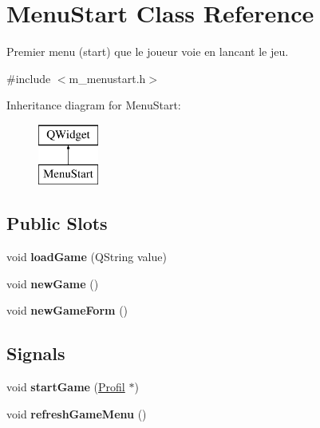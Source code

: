 \hypertarget{class_menu_start}{}\section{Menu\+Start Class Reference}
\label{class_menu_start}


Premier menu (start) que le joueur voie en lancant le jeu.  




{\ttfamily \#include $<$m\+\_\+menustart.\+h$>$}

Inheritance diagram for Menu\+Start\+:\begin{figure}[H]
\begin{center}
\leavevmode
\includegraphics[height=2.000000cm]{class_menu_start}
\end{center}
\end{figure}
\subsection*{Public Slots}
\begin{DoxyCompactItemize}
\item 
\hypertarget{class_menu_start_a8af8ec946e4b575852937b469bfe3d59}{}void {\bfseries load\+Game} (Q\+String value)\label{class_menu_start_a8af8ec946e4b575852937b469bfe3d59}

\item 
\hypertarget{class_menu_start_a3ebce084546f1f9374a2e1cd0378d17a}{}void {\bfseries new\+Game} ()\label{class_menu_start_a3ebce084546f1f9374a2e1cd0378d17a}

\item 
\hypertarget{class_menu_start_a27892e476830d761fae92cc8b7db323f}{}void {\bfseries new\+Game\+Form} ()\label{class_menu_start_a27892e476830d761fae92cc8b7db323f}

\end{DoxyCompactItemize}
\subsection*{Signals}
\begin{DoxyCompactItemize}
\item 
\hypertarget{class_menu_start_a6bb370ac28c64683a712f30b19a97bc8}{}void {\bfseries start\+Game} (\hyperlink{class_profil}{Profil} $\ast$)\label{class_menu_start_a6bb370ac28c64683a712f30b19a97bc8}

\item 
\hypertarget{class_menu_start_a277ad4799e66f6b7e314d159467bc963}{}void {\bfseries refresh\+Game\+Menu} ()\label{class_menu_start_a277ad4799e66f6b7e314d159467bc963}

\end{DoxyCompactItemize}
